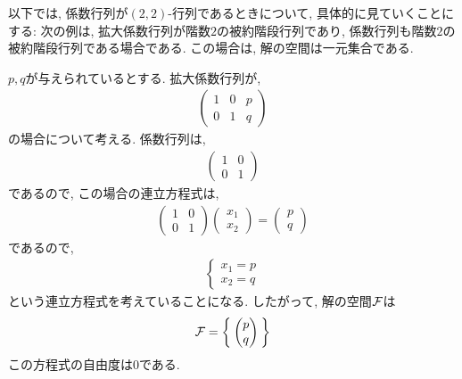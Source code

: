 以下では,
係数行列が$(2,2)$-行列であるときについて,
具体的に見ていくことにする:
次の例は,
拡大係数行列が階数$2$の被約階段行列であり,
係数行列も階数$2$の被約階段行列である場合である.
この場合は,
解の空間は一元集合である.
\begin{example}
  \label{eg:eq:reduced:1}
  $p,q$が与えられているとする.
  拡大係数行列が,
  \begin{align*}
    \begin{pmatrix}
      1&0&p\\0&1&q
    \end{pmatrix}
  \end{align*}
  の場合について考える.
  係数行列は,
  \begin{align*}
    \begin{pmatrix}
      1&0\\0&1
    \end{pmatrix}
  \end{align*}
  であるので, この場合の連立方程式は,
  \begin{align*}
    \begin{pmatrix}
      1&0\\0&1
    \end{pmatrix}
    \begin{pmatrix}x_1\\x_2\end{pmatrix}
      =
      \begin{pmatrix}
        p\\q
      \end{pmatrix}
  \end{align*}
  であるので,
  \begin{align*}
    \begin{cases}
      x_1=p\\
      x_2=q
    \end{cases}
  \end{align*}
  という連立方程式を考えていることになる.
  したがって, 解の空間$\mathcal{F}$は
  \begin{align*}
    \mathcal{F}=\Set{\begin{pmatrix}p\\q\end{pmatrix}}
  \end{align*}
  この方程式の自由度は$0$である.
\end{example}

